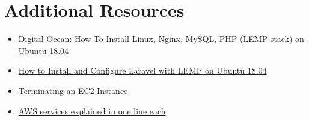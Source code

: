 \section{Additional Resources}

\begin{itemize}[leftmargin=*]
    \item \href{https://www.digitalocean.com/community/tutorials/how-to-install-linux-nginx-mysql-php-lemp-stack-ubuntu-18-04}{Digital Ocean: How To Install Linux, Nginx, MySQL, PHP (LEMP stack) on Ubuntu 18.04}
    \item \href{https://www.digitalocean.com/community/tutorials/how-to-install-and-configure-laravel-with-lemp-on-ubuntu-18-04}{How to Install and Configure Laravel with LEMP on Ubuntu 18.04}
    \item \href{https://docs.aws.amazon.com/AWSEC2/latest/UserGuide/terminating-instances.html}{Terminating an EC2 Instance}
    \item \href{https://adayinthelifeof.nl/2020/05/20/aws.html}{AWS services explained in one line each}
\end{itemize}
